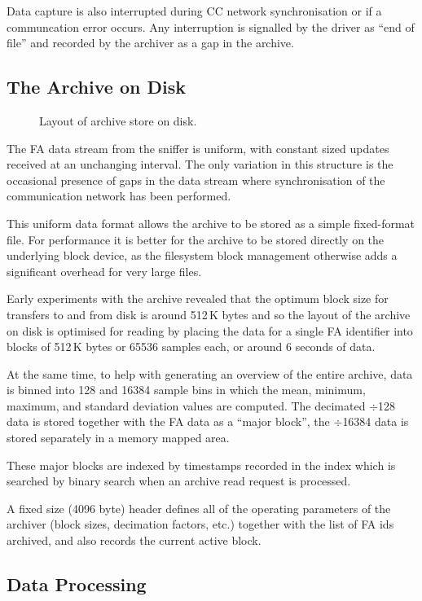 \documentclass{JAC2003}
\begin{document}
Data capture is also interrupted during CC network synchronisation or if a
communcation error occurs.  Any interruption is signalled by the driver as ``end
of file'' and recorded by the archiver as a gap in the archive.


\subsection{The Archive on Disk}

\begin{figure}[ht]

\caption{Layout of archive store on disk.}
\label{fa-layout}
\end{figure}


The FA data stream from the sniffer is uniform, with constant sized updates
received at an unchanging interval.  The only variation in this structure is the
occasional presence of gaps in the data stream where synchronisation of the
communication network has been performed.

This uniform data format allows the archive to be stored as a simple
fixed-format file.  For performance it is better for the archive to be stored
directly on the underlying block device, as the filesystem block management
otherwise adds a significant overhead for very large files.

Early experiments with the archive revealed that the optimum block size for
transfers to and from disk is around 512\,K bytes and so the layout of the
archive on disk is optimised for reading by placing the data for a single FA
identifier into blocks of 512\,K bytes or 65536 samples each, or around
6\textonehalf{} seconds of data.

At the same time, to help with generating an overview of the entire archive,
data is binned into 128 and 16384 sample bins in which the mean, minimum,
maximum, and standard deviation values are computed.  The decimated $\div$128
data is stored together with the FA data as a ``major block'', the $\div$16384
data is stored separately in a memory mapped area.

These major blocks are indexed by timestamps recorded in the index which is
searched by binary search when an archive read request is processed.

A fixed size (4096 byte) header defines all of the operating parameters of the
archiver (block sizes, decimation factors, etc.) together with the list of FA
ids archived, and also records the current active block.

\subsection{Data Processing}
\end{document}
